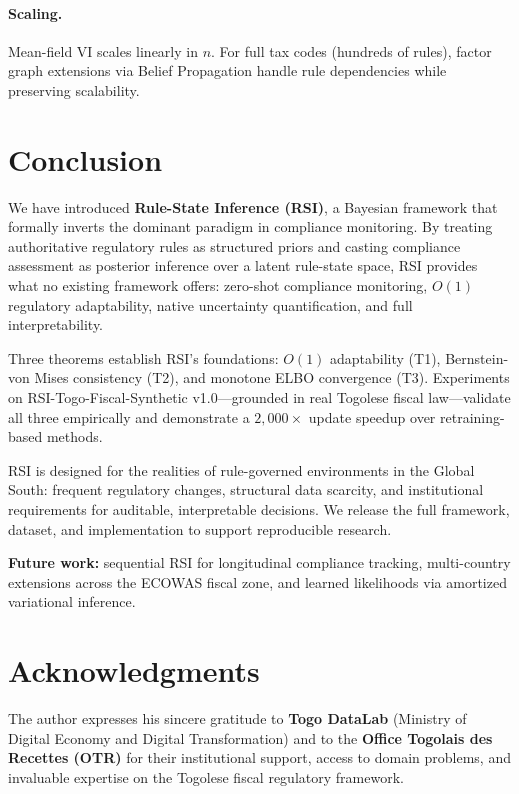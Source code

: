 \documentclass[letterpaper]{article}
\begin{document}
\paragraph{Scaling.}
Mean-field VI scales linearly in $n$. For full tax codes (hundreds of
rules), factor graph extensions via Belief Propagation handle rule
dependencies while preserving scalability.

\section{Conclusion}
\label{sec:conclusion}

We have introduced \textbf{Rule-State Inference (RSI)}, a Bayesian
framework that formally inverts the dominant paradigm in compliance
monitoring. By treating authoritative regulatory rules as structured
priors and casting compliance assessment as posterior inference over
a latent rule-state space, RSI provides what no existing framework
offers: zero-shot compliance monitoring, $O(1)$ regulatory adaptability,
native uncertainty quantification, and full interpretability.

Three theorems establish RSI's foundations: $O(1)$ adaptability (T1),
Bernstein-von Mises consistency (T2), and monotone ELBO convergence
(T3). Experiments on RSI-Togo-Fiscal-Synthetic v1.0---grounded in
real Togolese fiscal law---validate all three empirically and
demonstrate a $2{,}000\times$ update speedup over retraining-based
methods.

RSI is designed for the realities of rule-governed environments in
the Global South: frequent regulatory changes, structural data scarcity,
and institutional requirements for auditable, interpretable decisions.
We release the full framework, dataset, and implementation to support
reproducible research.

\medskip
\noindent\textbf{Future work:} sequential RSI for longitudinal
compliance tracking, multi-country extensions across the ECOWAS fiscal
zone, and learned likelihoods via amortized variational inference.

\section*{Acknowledgments}

The author expresses his sincere gratitude to \textbf{Togo DataLab}
(Ministry of Digital Economy and Digital Transformation) and to the
\textbf{Office Togolais des Recettes (OTR)} for their institutional
support, access to domain problems, and invaluable expertise on the
Togolese fiscal regulatory framework.
\end{document}
